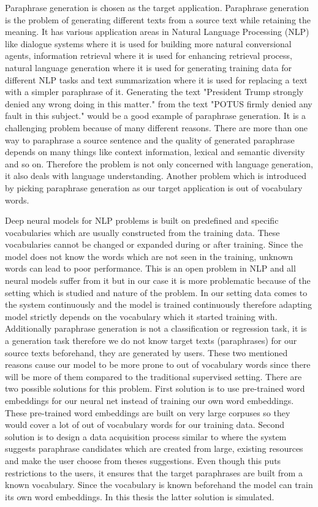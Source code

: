 Paraphrase generation is chosen as the target application. Paraphrase generation is the problem of generating different texts from a source text while retaining the meaning. It has various application areas in Natural Language Processing (NLP) like dialogue systems where it is used for building more natural conversional agents, information retrieval where it is used for enhancing retrieval process, natural language generation where it is used for generating training data for different NLP tasks and text summarization where it is used for replacing a text with a simpler paraphrase of it. Generating the text "President Trump strongly denied any wrong doing in this matter." from the text "POTUS firmly denied any fault in this subject." would be a good example of paraphrase generation. It is a challenging problem because of many different reasons. There are more than one way to paraphrase a source sentence and the quality of generated paraphrase depends on many things like context information, lexical and semantic diversity and so on. Therefore the problem is not only concerned with language generation, it also deals with language understanding. Another problem which is introduced by picking paraphrase generation as our target application is out of vocabulary words. 

Deep neural models for NLP problems is built on predefined and specific vocabularies which are usually constructed from the training data. These vocabularies cannot be changed or expanded during or after training. Since the model does not know the words which are not seen in the training, unknown words can lead to poor performance. This is an open problem in NLP and all neural models suffer from it but in our case it is more problematic because of the setting which is studied and nature of the problem. In our setting data comes to the system continuously and the model is trained continuously therefore adapting model strictly depends on the vocabulary which it started training with. Additionally paraphrase generation is not a classification or regression task, it is a generation task therefore we do not know target texts (paraphrases) for our source texts beforehand, they are generated by users. These two mentioned reasons cause our model to be more prone to out of vocabulary words since there will be more of them compared to the traditional supervised setting. There are two possible solutions for this problem. First solution is to use pre-trained word embeddings for our neural net instead of training our own word embeddings. These pre-trained word embeddings are built on very large corpuses so they would cover a lot of out of vocabulary words for our training data. Second solution is to design a data acquisition process similar to \cite{par4sim} where the system suggests paraphrase candidates which are created from large, existing resources and make the user choose from theses suggestions. Even though this puts restrictions to the users, it ensures that the target paraphrases are built from a known vocabulary. Since the vocabulary is known beforehand the model can train its own word embeddings. In this thesis the latter solution is simulated. 

